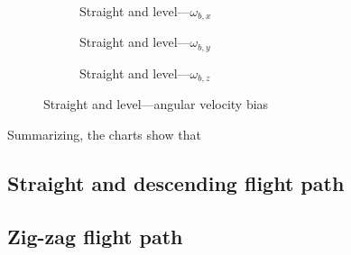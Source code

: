 \begin{figure}[!ht]
    \centering
    \begin{subfigure}{0.3\textwidth}
        
        \caption{Straight and level---$\omega_{b,x}$}
    \end{subfigure}
    \hfill
    \begin{subfigure}{0.3\textwidth}
        
        \caption{Straight and level---$\omega_{b,y}$}
    \end{subfigure}
    \hfill
    \begin{subfigure}{0.3\textwidth}
        
        \caption{Straight and level---$\omega_{b,z}$}
    \end{subfigure}
    \caption{Straight and level---angular velocity bias}\label{fig:straight-level-wbias}
\end{figure}

Summarizing, the charts show that


\subsection{Straight and descending flight path}

\subsection{Zig-zag flight path}